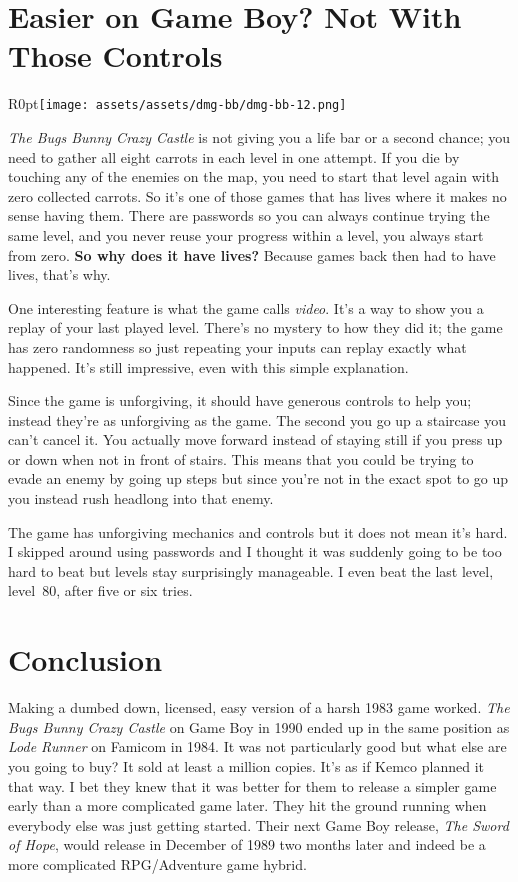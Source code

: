 \documentclass{book}
\begin{document}
\FloatBarrier\section*{Easier on Game Boy? Not With Those Controls}
\begin{wrapfigure}{R}{0pt}{\texttt{[image: assets/assets/dmg-bb/dmg-bb-12.png]}}\end{wrapfigure}
\emph{The Bugs Bunny Crazy Castle} is not giving you a life bar or a second chance; you need to gather all eight carrots in each level in one attempt. If you die by touching any of the enemies on the map, you need to start that level again with zero collected carrots. So it’s one of those games that has lives where it makes no sense having them. There are passwords so you can always continue trying the same level, and you never reuse your progress within a level, you always start from zero. \textbf{So why does it have lives?} Because games back then had to have lives, that’s why.\par
One interesting feature is what the game calls \emph{video}. It’s a way to show you a replay of your last played level. There’s no mystery to how they did it; the game has zero randomness so just repeating your inputs can replay exactly what happened. It’s still impressive, even with this simple explanation.\par
Since the game is unforgiving, it should have generous controls to help you; instead they’re as unforgiving as the game. The second you go up a staircase you can’t cancel it. You actually move forward instead of staying still if you press up or down when not in front of stairs. This means that you could be trying to evade an enemy by going up steps but since you’re not in the exact spot to go up you instead rush headlong into that enemy.\par
The game has unforgiving mechanics and controls but it does not mean it’s hard. I skipped around using passwords and I thought it was suddenly going to be too hard to beat but levels stay surprisingly manageable. I even beat the last level, level~80, after five or six tries.\par
\FloatBarrier\section*{Conclusion}
Making a dumbed down, licensed, easy version of a harsh 1983 game worked. \emph{The Bugs Bunny Crazy Castle} on Game Boy in 1990 ended up in the same position as \emph{Lode Runner} on Famicom in 1984. It was not particularly good but what else are you going to buy? It sold at least a million copies. It’s as if Kemco planned it that way. I bet they knew that it was better for them to release a simpler game early than a more complicated game later. They hit the ground running when everybody else was just getting started. Their next Game Boy release, \emph{The Sword of Hope}, would release in December of 1989 two months later and indeed be a more complicated RPG/Adventure game hybrid.\par
\end{document}
